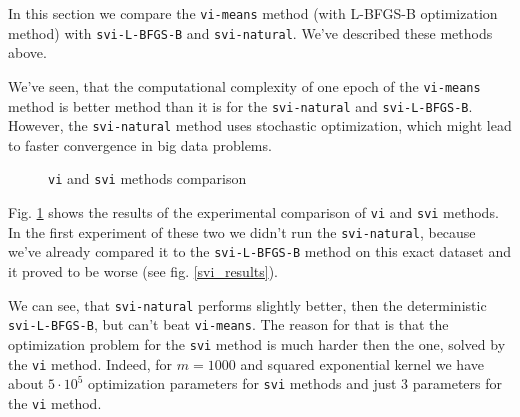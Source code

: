 In this section we compare the \lstinline{vi-means} method (with L-BFGS-B optimization method) with \lstinline{svi-L-BFGS-B} and \lstinline{svi-natural}. We've described these methods above. 

We've seen, that the computational complexity of one epoch of the \lstinline{vi-means} method is better method than it is for the \lstinline{svi-natural} and \lstinline{svi-L-BFGS-B}. However, the \lstinline{svi-natural} method uses stochastic optimization, which might lead to faster convergence in big data problems.

\begin{figure}[!h]
	\centering
	\subfloat{
		\scalebox{0.75}{
	    	
		}
	}
	\subfloat{
		\scalebox{0.73}{
			
		}
	}
	\caption{\lstinline{vi} and \lstinline{svi} methods comparison}
	\label{visvi_results}
\end{figure}

Fig. \ref{visvi_results} shows the results of the experimental comparison of \lstinline{vi} and \lstinline{svi} methods. In the first experiment of these two we didn't run the \lstinline{svi-natural}, because we've already compared it to the \lstinline{svi-L-BFGS-B} method on this exact dataset and it proved to be worse (see fig. \ref{svi_results}).

We can see, that \lstinline{svi-natural} performs slightly better, then the deterministic \lstinline{svi-L-BFGS-B}, but can't beat \lstinline{vi-means}. The reason for that is that the optimization problem for the \lstinline{svi} method is much harder then the one, solved by the \lstinline{vi} method. Indeed, for $m = 1000$ and squared exponential kernel we have about $5 \cdot 10^5$ optimization parameters for \lstinline{svi} methods and just $3$ parameters for the \lstinline{vi} method.
